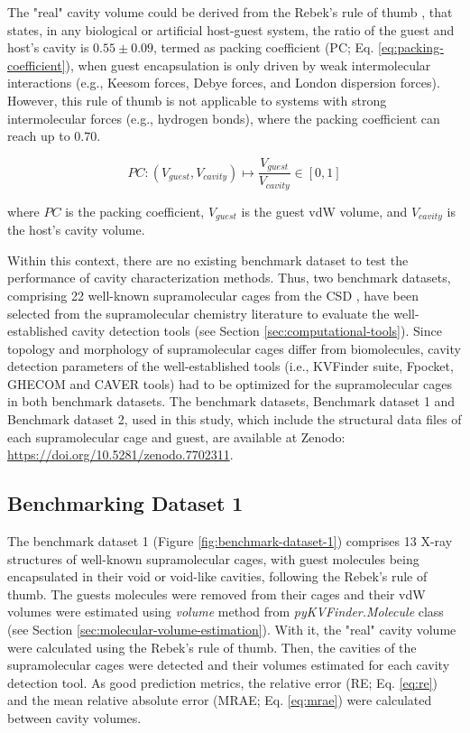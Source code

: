 \documentclass[Ingles]{phdthesis}
\def\ie{i.e.\onedot}
\def\eg{e.g.\onedot}
\begin{document}
The "real" cavity volume could be derived from the Rebek's rule of thumb \cite{mecozzi1998}, that states, in any biological or artificial host-guest system, the ratio of the guest and host's cavity is $0.55\pm0.09$, termed as packing  coefficient (\acs{PC}; Eq. \ref{eq:packing-coefficient}), when guest encapsulation is only driven by weak intermolecular interactions (\eg, Keesom forces, Debye forces, and London dispersion forces). However, this rule of thumb is not applicable to systems with strong intermolecular forces (\eg, hydrogen bonds), where the packing coefficient can reach up to $0.70$. 

\begin{equation}
  PC \colon (V_{guest},V_{cavity}) \mapsto \frac{V_{guest}}{V_{cavity}} \in [0,1]
  \label{eq:packing-coefficient}
\end{equation}

\noindent where $PC$ is the packing coefficient, $V_{guest}$ is the guest \acs{vdW} volume, and $V_{cavity}$ is the host's cavity volume.

Within this context, there are no existing benchmark dataset to test the performance of cavity characterization methods. Thus, two benchmark datasets, comprising 22 well-known supramolecular cages from the \ac{CSD} \cite{csd}, have been selected from the supramolecular chemistry literature to evaluate the well-established cavity detection tools (see Section \ref{sec:computational-tools}). Since topology and morphology of supramolecular cages differ from biomolecules, cavity detection parameters of the well-established tools (\ie, KVFinder suite, Fpocket, GHECOM and CAVER tools) had to be optimized for the supramolecular cages in both benchmark datasets. The benchmark datasets, Benchmark dataset 1 and Benchmark dataset 2, used in this study, which include the structural data files of each supramolecular cage and guest, are available at Zenodo: \url{https://doi.org/10.5281/zenodo.7702311}.

\subsection{Benchmarking Dataset 1}

The benchmark dataset 1 (Figure \ref{fig:benchmark-dataset-1}) comprises 13 X-ray structures of well-known supramolecular cages, with guest molecules being encapsulated in their void or void-like cavities, following the Rebek's rule of thumb. The guests molecules were removed from their cages and their \acs{vdW} volumes were estimated using \textit{volume} method from \textit{pyKVFinder.Molecule} class (see Section \ref{sec:molecular-volume-estimation}). With it, the "real" cavity volume were calculated using the Rebek's rule of thumb. Then, the cavities of the supramolecular cages were detected and their volumes estimated for each cavity detection tool. As good prediction metrics, the relative error (\acs{RE}; Eq. \ref{eq:re}) and the mean relative absolute error (\acs{MRAE}; Eq. \ref{eq:mrae}) were calculated between cavity volumes.
\end{document}
